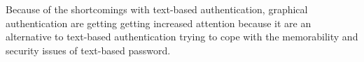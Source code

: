 
  Because of the shortcomings with text-based authentication, graphical authentication are getting getting increased attention because it are an alternative to text-based authentication trying to cope with the memorability and security issues of text-based password.
